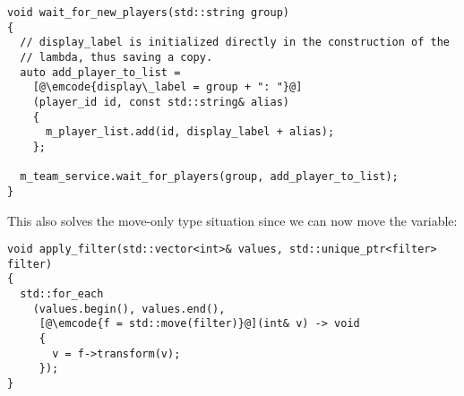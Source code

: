 \begin{lstlisting}
void wait_for_new_players(std::string group)
{
  // display_label is initialized directly in the construction of the
  // lambda, thus saving a copy.
  auto add_player_to_list =
    [@\emcode{display\_label = group + ": "}@]
    (player_id id, const std::string& alias)
    {
      m_player_list.add(id, display_label + alias);
    };

  m_team_service.wait_for_players(group, add_player_to_list);
}
\end{lstlisting}

This also solves the move-only type situation since we can now move the
variable:

\begin{lstlisting}
void apply_filter(std::vector<int>& values, std::unique_ptr<filter> filter)
{
  std::for_each
    (values.begin(), values.end(),
     [@\emcode{f = std::move(filter)}@](int& v) -> void
     {
       v = f->transform(v);
     });
}
\end{lstlisting}
